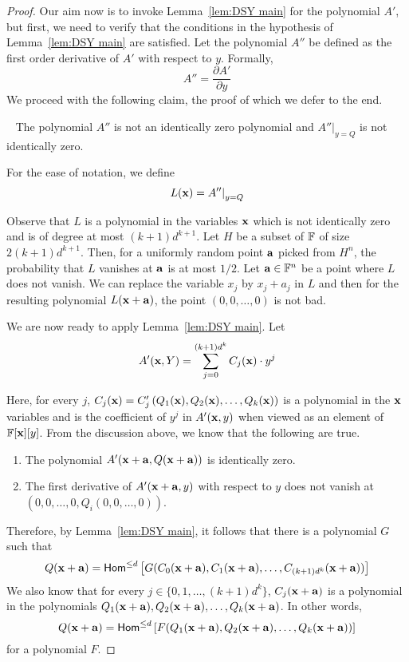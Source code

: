 \begin{proof}
Our aim now is to invoke Lemma~\ref{lem:DSY main} for the polynomial $A'$, but first, we need to verify that the conditions in the hypothesis of Lemma~\ref{lem:DSY main} are satisfied. Let the polynomial $A''$ be defined as the first order derivative of $A'$ with respect to $y$. Formally, 
$$A'' = \frac{\partial{A'}}{\partial y}$$
We proceed with the following claim, the proof of which we defer to the end. 
\begin{claim}~\label{clm:derivative nonzero}
The polynomial $A''$ is not an identically zero polynomial and ${A''|}_{y = Q}$ is not identically zero. 
\end{claim}
For the ease of notation, we define 
\[
{L}(\mathbf{x}) = {A''|}_{y = Q}
\]

Observe that $L$ is a polynomial in the variables $\mathbf{x}$ which is not identically zero and is of degree at most $(k+1)d^{k+1}$. Let $H$ be a subset of $\mathbb{F}$ of size $2(k+1)d^{k+1}$.  Then, for a uniformly random point $\mathbf{a}$ picked from $H^n$, the probability that $L$ vanishes at $\mathbf{a}$ is at most $1/2$. Let $\mathbf{a} \in \mathbb{F}^n$ be a point where $L$ does not vanish. 
We can replace the variable $x_j$ by $x_j + a_{j}$ in $L$ and then for the resulting polynomial $L(\mathbf{x} + \mathbf{a})$, the point $(0, 0, \ldots, 0)$ is not bad. 

We are now ready to apply Lemma~\ref{lem:DSY main}. Let 
$$A'(\mathbf{x} , Y) = \sum_{j = 0}^{(k+1)d^k} C_j(\mathbf{x})\cdot y^j$$ 

Here, for every $j$, $C_j(\mathbf{x}) = C_j'\left(Q_1(\mathbf{x}),Q_2(\mathbf{x}), \ldots, Q_k(\mathbf{x} )\right)$ is a polynomial in the $\mathbf{x}$ variables and is the coefficient of $y^j$ in  $A'(\mathbf{x}, y)$  when viewed as an element of $\mathbb{F}[\mathbf{x}][y]$. 
From the discussion above, we know that the following are true. 
\begin{enumerate}
\item The polynomial $A'(\mathbf{x} + \mathbf{a}, Q(\mathbf{x} + \mathbf{a}))$ is identically zero. 
\item The first derivative of $A'(\mathbf{x} + \mathbf{a}, y)$ with respect to $y$ does not vanish at  $(0, 0, \ldots, 0, Q_i(0, 0, \ldots, 0))$. 
\end{enumerate}
Therefore, by Lemma~\ref{lem:DSY main}, it follows that there is a polynomial $G$ such that 
$$Q(\mathbf{x} + \mathbf{a}) = \mathsf{Hom}^{\leq d}\left[G(C_0(\mathbf{x} + \mathbf{a}), C_1(\mathbf{x} + \mathbf{a}), \ldots, C_{(k+1)d^k}(\mathbf{x} + \mathbf{a})) \right] $$
We also know that for every $j \in \{0, 1, \ldots, (k+1)d^k\}$, $C_j(\mathbf{x} + \mathbf{a})$ is a polynomial in the polynomials $Q_1(\mathbf{x} + \mathbf{a}),Q_2(\mathbf{x} + \mathbf{a}), \ldots, Q_k(\mathbf{x} + \mathbf{a})$. In other words, 
$$Q(\mathbf{x} + \mathbf{a}) = \mathsf{Hom}^{\leq d}\left[F(Q_1(\mathbf{x} + \mathbf{a}), Q_2(\mathbf{x} + \mathbf{a}), \ldots, Q_{k}(\mathbf{x} + \mathbf{a})) \right] $$
for  a polynomial $F$. 


\end{proof}
